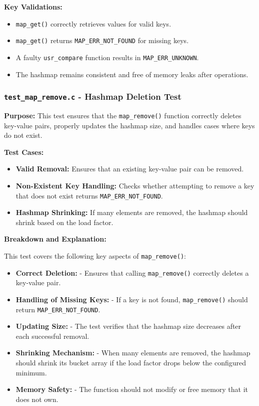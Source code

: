 \documentclass[titlepage]{article}
\begin{document}
\textbf{Key Validations:}
\begin{itemize}
    \item \texttt{map\_get()} correctly retrieves values for valid keys.
    \item \texttt{map\_get()} returns \texttt{MAP\_ERR\_NOT\_FOUND} for missing keys.
    \item A faulty \texttt{usr\_compare} function results in \texttt{MAP\_ERR\_UNKNOWN}.
    \item The hashmap remains consistent and free of memory leaks after operations.
\end{itemize}

\subsubsection{\texttt{test\_map\_remove.c} - Hashmap Deletion Test}

\textbf{Purpose:}
This test ensures that the \texttt{map\_remove()} function correctly deletes key-value pairs, properly updates the hashmap size, and handles cases where keys do not exist.

\textbf{Test Cases:}
\begin{itemize}
    \item \textbf{Valid Removal:} Ensures that an existing key-value pair can be removed.
    \item \textbf{Non-Existent Key Handling:} Checks whether attempting to remove a key that does not exist returns \texttt{MAP\_ERR\_NOT\_FOUND}.
    \item \textbf{Hashmap Shrinking:} If many elements are removed, the hashmap should shrink based on the load factor.
\end{itemize}
\textbf{Breakdown and Explanation:}

This test covers the following key aspects of \texttt{map\_remove()}:

\begin{itemize}
    \item \textbf{Correct Deletion:}
    - Ensures that calling \texttt{map\_remove()} correctly deletes a key-value pair.

    \item \textbf{Handling of Missing Keys:}
    - If a key is not found, \texttt{map\_remove()} should return \texttt{MAP\_ERR\_NOT\_FOUND}.

    \item \textbf{Updating Size:}
    - The test verifies that the hashmap size decreases after each successful removal.

    \item \textbf{Shrinking Mechanism:}
    - When many elements are removed, the hashmap should shrink its bucket array if the load factor drops below the configured minimum.

    \item \textbf{Memory Safety:}
    - The function should not modify or free memory that it does not own.
\end{itemize}
\end{document}
